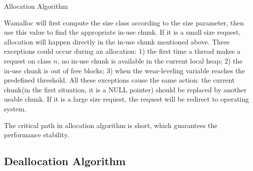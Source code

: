 \documentclass{vldb}
\begin{document}
\begin{algorithm}
\caption{Allocation Algorithm}\label{euclid}
\end{algorithm}

Wamalloc will first compute the size class according to the size parameter, 
then use this value to find the appropriate in-use chunk.
If it is a small size request, allocation will happen directly in the in-use chunk mentioned above.
Three exceptions could occur during an allocation:
1) the first time a thread makes a request on class $n$, no in-use chunk is available in the current local heap;
2) the in-use chunk is out of free blocks;
3) when the wear-leveling variable reaches the predefined threshold.
All these exceptions cause the same action: the current chunk(in the first situation, it is a NULL pointer) should be replaced by another usable chunk.
If it is a large size request, the request will be redirect to operating system.

The critical path in allocation algorithm is short, which guarantees the performance stability.

\subsection{Deallocation Algorithm}
\end{document}
